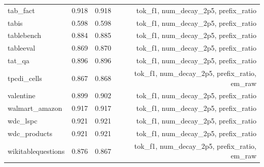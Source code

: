 \begin{table}[t]
\begin{tabular}{lrrr}
tab\_fact & 0.918 & 0.918 & tok\_f1, num\_decay\_2p5, prefix\_ratio \\
tabis & 0.598 & 0.598 & tok\_f1, num\_decay\_2p5, prefix\_ratio \\
tablebench & 0.884 & 0.885 & tok\_f1, num\_decay\_2p5, prefix\_ratio \\
tableeval & 0.869 & 0.870 & tok\_f1, num\_decay\_2p5, prefix\_ratio \\
tat\_qa & 0.896 & 0.896 & tok\_f1, num\_decay\_2p5, prefix\_ratio \\
tpcdi\_cells & 0.867 & 0.868 & tok\_f1, num\_decay\_2p5, prefix\_ratio, em\_raw \\
valentine & 0.899 & 0.902 & tok\_f1, num\_decay\_2p5, prefix\_ratio \\
walmart\_amazon & 0.917 & 0.917 & tok\_f1, num\_decay\_2p5, prefix\_ratio \\
wdc\_lspc & 0.921 & 0.921 & tok\_f1, num\_decay\_2p5, prefix\_ratio \\
wdc\_products & 0.921 & 0.921 & tok\_f1, num\_decay\_2p5, prefix\_ratio \\
wikitablequestions & 0.876 & 0.867 & tok\_f1, num\_decay\_2p5, prefix\_ratio, em\_raw \\
\bottomrule
\end{tabular}

\end{table}